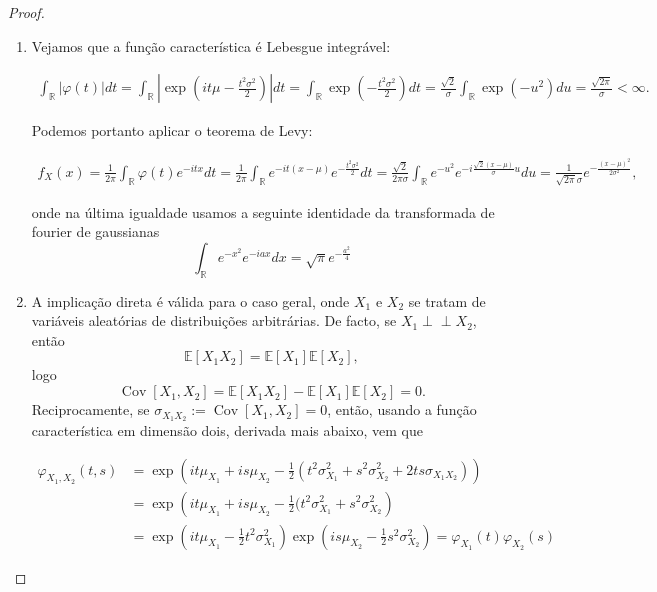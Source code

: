 \documentclass{article}
\begin{document}
\begin{proof}
\begin{enumerate}[label=\roman*), align=left]
    
    \item 

    
    Vejamos que a função característica é Lebesgue integrável:

    \begin{align*}
        \int_\mathbb{R}|\varphi(t)|dt=\int_\mathbb{R} \left|\exp \left(it\mu-\frac{t^2\sigma^2}{2} \right) \right|dt= \int_\mathbb{R} \exp \left(-\frac{t^2 \sigma^2}{2} \right) dt = \frac{\sqrt{2}}{\sigma}\int_\mathbb{R} \exp(- u^2)du=\frac{\sqrt{2\pi}}{\sigma}<\infty.
    \end{align*}

    \vspace{0.2cm}

    Podemos portanto aplicar o teorema de Levy:

    \begin{align*}
        f_X(x) = \frac{1}{2\pi}\int_\mathbb{R}\varphi(t)e^{-itx}dt=\frac{1}{2\pi}\int_{\mathbb{R}}e^{-it(x-\mu)}e^{-\frac{t^2 \sigma^2}{2}}dt=\frac{\sqrt{2}}{2 \pi \sigma} \int_\mathbb{R}e^{-u^2}e^{-i\frac{\sqrt{2}(x-\mu)}{\sigma}u}du=\frac{1}{\sqrt{2\pi}\sigma}e^{-\frac{(x-\mu)^2}{2\sigma^2}},
    \end{align*}

    onde na última igualdade usamos a seguinte identidade da transformada de fourier de gaussianas
    $$\int_\mathbb{R}e^{-x^2}e^{-iax}dx=\sqrt{\pi}e^{-\frac{a^2}{4}}$$

    \vspace{0.5cm}

    \item A implicação direta é válida para o caso geral, onde $X_1$ e $X_2$ se tratam de variáveis aleatórias de distribuições arbitrárias. De facto, se $X_1 \perp\!\!\!\perp X_2$, então 
    $$\mathbb{E}[X_1X_2]=\mathbb{E}[X_1]\mathbb{E}[X_2],$$ 
    logo
    $$\operatorname{Cov}[X_1,X_2]=\mathbb{E}[X_1X_2]-\mathbb{E}[X_1]\mathbb{E}[X_2]=0.$$
    \vspace{0.1cm}
    Reciprocamente, se $\sigma_{X_1X_2}:=\operatorname{Cov}[X_1,X_2]=0$, então, usando a função característica em dimensão dois, derivada mais abaixo, vem que

    \begin{align*}
        \varphi_{X_1,X_2}(t,s) & =\exp \left( it\mu_{X_1}+is\mu_{X_2}-\frac{1}{2}(t^2\sigma^2_{X_1}+s^2\sigma^2_{X_2}+2ts\sigma_{X_1X_2}) \right) \\
                               & =\exp \left( it\mu_{X_1}+is\mu_{X_2}-\frac{1}{2}(t^2\sigma^2_{X_1}+s^2\sigma^2_{X_2} \right)\\
                               & =\exp \left( it\mu_{X_1} -\frac{1}{2}t^2\sigma^2_{X_1}\right) \exp \left( is\mu_{X_2} -\frac{1}{2}s^2\sigma^2_{X_2} \right)
                               =\varphi_{X_1}(t)\varphi_{X_2}(s)
    \end{align*}


\end{enumerate}
\end{proof}
\end{document}
